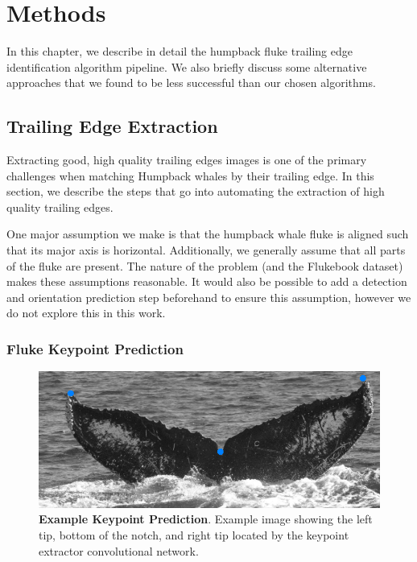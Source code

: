   
\chapter{Methods} \label{sec:methods}

In this chapter, we describe in detail the humpback fluke trailing edge identification algorithm pipeline.
We also briefly discuss some alternative approaches that we found to be less successful than our chosen algorithms.

\section{Trailing Edge Extraction}

Extracting good, high quality trailing edges images is one of the primary challenges when matching Humpback whales by their trailing edge.
In this section, we describe the steps that go into automating the extraction of high quality trailing edges.

One major assumption we make is that the humpback whale fluke is aligned such that its major axis is horizontal.
Additionally, we generally assume that all parts of the fluke are present.
The nature of the problem (and the Flukebook dataset) makes these assumptions reasonable.
It would also be possible to add a detection and orientation prediction step beforehand to ensure this assumption, however we do not explore this in this work.

\subsection{Fluke Keypoint Prediction}


\begin{figure}[t]%
\centering
\includegraphics[width=1.0\textwidth]{../images/aid88_kpoverlay.png}
\caption{\textbf{Example Keypoint Prediction}. Example image showing the left tip, bottom of the notch, and right tip located by the keypoint extractor convolutional network.}
\label{fig:example_kp}
\end{figure}

